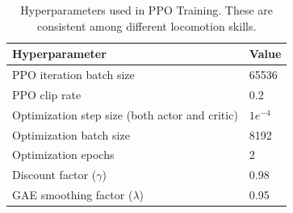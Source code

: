 \begin{table}[!]
\scriptsize
\centering
\caption{Hyperparameters used in PPO Training. These are consistent among different locomotion skills.}
\label{tab:hyperparam_ppo}
\begin{tabular}{|l|l|}
\hline
\textbf{Hyperparameter} & \textbf{Value} \\ \hline
PPO iteration batch size & 65536 \\ \hline
PPO clip rate & 0.2 \\ \hline
Optimization step size (both actor and critic) & $1e^{-4}$ \\ \hline
Optimization batch size & 8192 \\ \hline
Optimization epochs & 2 \\ \hline
Discount factor ($\gamma$) & 0.98 \\ \hline
GAE smoothing factor ($\lambda$) & 0.95 \\ \hline
\end{tabular}
\end{table}